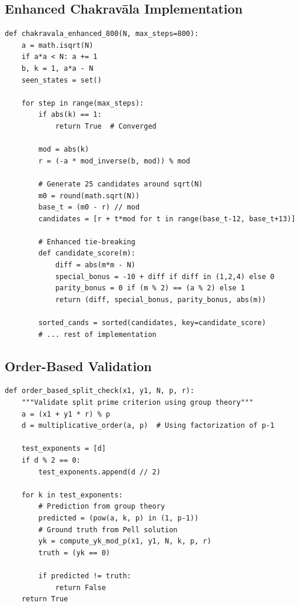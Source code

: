 \documentclass[12pt]{article}
\begin{document}
\subsection{Enhanced Chakravāla Implementation}

\begin{lstlisting}[caption=Enhanced Chakravāla with Expanded Search]
def chakravala_enhanced_800(N, max_steps=800):
    a = math.isqrt(N)
    if a*a < N: a += 1
    b, k = 1, a*a - N
    seen_states = set()
    
    for step in range(max_steps):
        if abs(k) == 1:
            return True  # Converged
        
        mod = abs(k)
        r = (-a * mod_inverse(b, mod)) % mod
        
        # Generate 25 candidates around sqrt(N)
        m0 = round(math.sqrt(N))
        base_t = (m0 - r) // mod
        candidates = [r + t*mod for t in range(base_t-12, base_t+13)]
        
        # Enhanced tie-breaking
        def candidate_score(m):
            diff = abs(m*m - N)
            special_bonus = -10 + diff if diff in (1,2,4) else 0
            parity_bonus = 0 if (m % 2) == (a % 2) else 1
            return (diff, special_bonus, parity_bonus, abs(m))
        
        sorted_cands = sorted(candidates, key=candidate_score)
        # ... rest of implementation
\end{lstlisting}

\subsection{Order-Based Validation}

\begin{lstlisting}[caption=Order-Based Split Prime Criterion]
def order_based_split_check(x1, y1, N, p, r):
    """Validate split prime criterion using group theory"""
    a = (x1 + y1 * r) % p
    d = multiplicative_order(a, p)  # Using factorization of p-1
    
    test_exponents = [d]
    if d % 2 == 0:
        test_exponents.append(d // 2)
    
    for k in test_exponents:
        # Prediction from group theory
        predicted = (pow(a, k, p) in (1, p-1))
        # Ground truth from Pell solution
        yk = compute_yk_mod_p(x1, y1, N, k, p, r)
        truth = (yk == 0)
        
        if predicted != truth:
            return False
    return True
\end{lstlisting}
\end{document}
